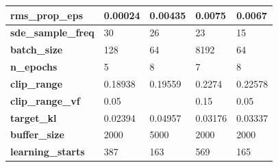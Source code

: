 \documentclass[../xlapes02]{subfiles}
\begin{document}
\begin{table}[!ht]
{\begin{tabular}{|l||l|l||l|l|}
                \textbf{rms\_prop\_eps}            & 0.00024                                      & 0.00435                                      & 0.0075                                       & 0.0067                                       \\ \hline
                \textbf{sde\_sample\_freq}         & 30                                           & 26                                           & 23                                           & 15                                           \\ \hline
                \textbf{batch\_size}               & 128                                          & 64                                           & 8192                                         & 64                                           \\ \hline
                \textbf{n\_epochs}                 & 5                                            & 8                                            & 7                                            & 8                                            \\ \hline
                \textbf{clip\_range}               & 0.18938                                      & 0.19559                                      & 0.2274                                       & 0.22578                                      \\ \hline
                \textbf{clip\_range\_vf}           & 0.05                                         & ~                                            & 0.15                                         & 0.05                                         \\ \hline
                \textbf{target\_kl}                & 0.02394                                      & 0.04957                                      & 0.03176                                      & 0.03337                                      \\ \hline
                \textbf{buffer\_size}              & 2000                                         & 5000                                         & 2000                                         & 2000                                         \\ \hline
                \textbf{learning\_starts}          & 387                                          & 163                                          & 569                                          & 165                                          \\ \hline

\end{tabular}}
\end{table}
\end{document}
